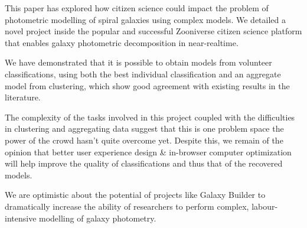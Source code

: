 \documentclass[../main.tex]{subfiles}
\begin{document}
\label{sec:conclusions}
This paper has explored how citizen science could impact the problem of photometric modelling of spiral galaxies using complex models. We detailed a novel project inside the popular and successful Zooniverse citizen science platform that enables galaxy photometric decomposition in near-realtime.

We have demonstrated that it is possible to obtain models from volunteer classifications, using both the best individual classification and an aggregate model from clustering, which show good agreement with existing results in the literature.

The complexity of the tasks involved in this project coupled with the difficulties in clustering and aggregating data suggest that this is one problem space the power of the crowd hasn't quite overcome yet. Despite this, we remain of the opinion that better user experience design \& in-browser computer optimization will help improve the quality of classifications and thus that of the recovered models.

We are optimistic about the potential of projects like Galaxy Builder to dramatically increase the ability of researchers to perform complex, labour-intensive modelling of galaxy photometry.
\end{document}
